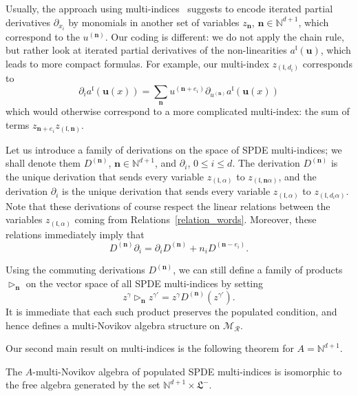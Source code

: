 \documentclass[AHL,Unicode,longabstracts]{cedram}
\newcommand{\bn}{\mathbf{n}}
\newcommand{\bu}{\mathbf{u}}
\newcommand{\mcM}{\mathcal{M}}
\newcommand{\mcR}{\mathcal{R}}
\newcommand{\mfl}{\mathfrak{l}}
\newcommand{\mfL}{\mathfrak{L}}
\newcommand{\bbN}{\mathbb{N}}
\begin{document}
\begin{remark}\label{remark_z_k}
Usually, the approach using multi-indices~\cite{BL23,LOT,OSSW} suggests to encode iterated partial derivatives $\partial_{x_i}$ by monomials in another set of variables $z_{\bn}$, $\bn\in\bbN^{d+1}$, which correspond to the $u^{(\bn)}$. Our coding is different: we do not apply the chain rule, but rather look at iterated partial derivatives of the non-linearities $a^\mfl(\bu)$, which leads to more compact formulas. For example, our multi-index $ z_{(\mfl,d_i)} $ corresponds to
\begin{equation*}
\partial_i a^\mfl(\bu(x)) = \sum_{\bn} u^{(\bn+e_i)} \partial_{u^{(\bn)}} a^\mfl(\bu(x))
\end{equation*}
which would otherwise correspond to a more complicated multi-index: the sum of terms $ z_{\bn+e_i} z_{(\mfl,\bn)} $.
\end{remark}

Let us introduce a family of derivations on the space of SPDE multi-indices; we shall denote them $D^{(\bn)}$, $\bn \in \bbN^{d+1}$, and $\partial_i$, $0\le i\le d$. The derivation $D^{(\bn)}$ is the unique derivation that sends every variable $z_{(\mfl,\alpha)}$ to $z_{(\mfl,\bn\alpha)}$, and the derivation $\partial_{i}$ is the unique derivation that sends every variable $z_{(\mfl,\alpha)}$ to $z_{(\mfl,d_i\alpha)}$. Note that these derivations of course respect the linear relations between the variables $z_{(\mfl,\alpha)}$ coming from Relations~\eqref{relation_words}. Moreover, these relations immediately imply that
\begin{equation*}\label{non-commutation_2}
D^{(\bn)} \partial_i =\partial_i D^{(\bn)} + n_i D^{(\bn-e_i)}.
\end{equation*}

Using the commuting derivations $D^{(\bn)}$, we can still define a family of products $\triangleright_\bn$ on the vector space of all SPDE multi-indices by setting
\begin{equation*}
z^{\gamma} \triangleright_\bn z^{\gamma'} = z^{\gamma} D^{(\bn)} (z^{\gamma'}).
\end{equation*}
It is immediate that each such product preserves the populated condition, and hence defines a multi-Novikov algebra structure on $\mcM_{\mcR}$.

Our second main result on multi-indices is the following theorem for $A = \bbN^{d+1}$.

\begin{theo}\label{second_main_theorem_multi_indices}
The $A$-multi-Novikov algebra of populated SPDE multi-indices is isomorphic to the free algebra generated by the set $\bbN^{d+1}\times \mfL^-$.
\end{theo}
\end{document}
